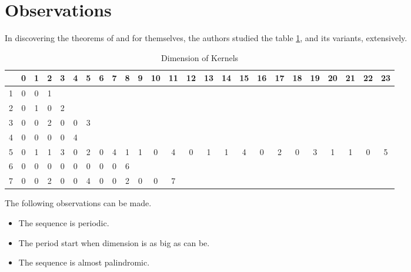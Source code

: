 \section{Observations}
In discovering the theorems of \cite{martin01} and \cite{leach17} for
themselves, the authors studied the table \ref{kernels}, and its variants, extensively.

\begin{table}
  \caption{Dimension of Kernels}\label{kernels}
  \fontsize{3}{4}\selectfont
  \begin{tabular}{|c|cccccccccccccccccccccccc|}
    \hline
    & \phantom{0}0 & \phantom{0}1 & \phantom{0}2 & \phantom{0}3 & \phantom{0}4 & \phantom{0}5 & \phantom{0}6 & \phantom{0}7 & \phantom{0}8 & \phantom{0}9 & 10 & 11 & 12 & 13 & 14 & 15 & 16 & 17 & 18 & 19 & 20 & 21 & 22 & 23 \\
    \hline
    \hline
    1 & 0 & 0 & 1 &   &   &   &   &   &   &   &   &   &   &   &   &   &   &   &   &   &   &   &   &   \\
    2 & 0 & 1 & 0 & 2 &   &   &   &   &   &   &   &   &   &   &   &   &   &   &   &   &   &   &   &   \\
    3 & 0 & 0 & 2 & 0 & 0 & 3 &   &   &   &   &   &   &   &   &   &   &   &   &   &   &   &   &   &   \\
    4 & 0 & 0 & 0 & 0 & 4 &   &   &   &   &   &   &   &   &   &   &   &   &   &   &   &   &   &   &   \\
    5 & 0 & 1 & 1 & 3 & 0 & 2 & 0 & 4 & 1 & 1 & 0 & 4 & 0 & 1 & 1 & 4 & 0 & 2 & 0 & 3 & 1 & 1 & 0 & 5 \\
    6 & 0 & 0 & 0 & 0 & 0 & 0 & 0 & 0 & 6 &   &   &   &   &   &   &   &   &   &   &   &   &   &   &   \\
    7 & 0 & 0 & 2 & 0 & 0 & 4 & 0 & 0 & 2 & 0 & 0 & 7 &   &   &   &   &   &   &   &   &   &   &   &   \\
    \hline
  \end{tabular}
\end{table}

The following observations can be made.

\begin{itemize}
\item The sequence is periodic.
\item The period start when dimension is as big as can be.
\item The sequence is almost palindromic.
\end{itemize}

